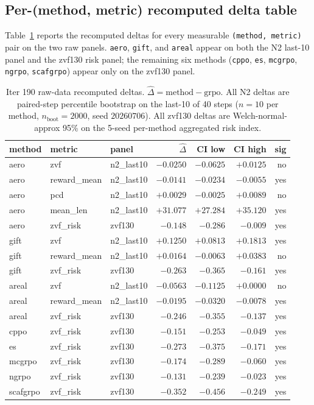 \subsection{Per-(method, metric) recomputed delta table}
Table~\ref{tab:p6-iter190-recomputed} reports the recomputed deltas for
every measurable \texttt{(method, metric)} pair on the two raw panels.
\verb|aero|, \verb|gift|, and \verb|areal| appear on both the
N2 last-10 panel and the zvf130 risk panel; the remaining six methods
(\verb|cppo|, \verb|es|, \verb|mcgrpo|, \verb|ngrpo|, \verb|scafgrpo|)
appear only on the zvf130 panel.

\begin{table}[h]
\centering
\small
\begin{tabular}{lllrrrr}
\toprule
method & metric & panel & $\hat\Delta$ & CI low & CI high & sig \\
\midrule
aero & zvf         & n2\_last10    & $-0.0250$ & $-0.0625$ & $+0.0125$ & no  \\
aero & reward\_mean& n2\_last10    & $-0.0141$ & $-0.0234$ & $-0.0055$ & yes \\
aero & pcd         & n2\_last10    & $+0.0029$ & $-0.0025$ & $+0.0089$ & no  \\
aero & mean\_len   & n2\_last10    & $+31.077$ & $+27.284$ & $+35.120$ & yes \\
aero & zvf\_risk   & zvf130        & $-0.148$  & $-0.286$  & $-0.009$  & yes \\
\midrule
gift & zvf         & n2\_last10    & $+0.1250$ & $+0.0813$ & $+0.1813$ & yes \\
gift & reward\_mean& n2\_last10    & $+0.0164$ & $-0.0063$ & $+0.0383$ & no  \\
gift & zvf\_risk   & zvf130        & $-0.263$  & $-0.365$  & $-0.161$  & yes \\
\midrule
areal& zvf         & n2\_last10    & $-0.0563$ & $-0.1125$ & $+0.0000$ & no  \\
areal& reward\_mean& n2\_last10    & $-0.0195$ & $-0.0320$ & $-0.0078$ & yes \\
areal& zvf\_risk   & zvf130        & $-0.246$  & $-0.355$  & $-0.137$  & yes \\
\midrule
cppo & zvf\_risk   & zvf130        & $-0.151$  & $-0.253$  & $-0.049$  & yes \\
es   & zvf\_risk   & zvf130        & $-0.273$  & $-0.375$  & $-0.171$  & yes \\
mcgrpo& zvf\_risk  & zvf130        & $-0.174$  & $-0.289$  & $-0.060$  & yes \\
ngrpo& zvf\_risk   & zvf130        & $-0.131$  & $-0.239$  & $-0.023$  & yes \\
scafgrpo& zvf\_risk& zvf130        & $-0.352$  & $-0.456$  & $-0.249$  & yes \\
\bottomrule
\end{tabular}
\caption{Iter 190 raw-data recomputed deltas. $\hat\Delta = \text{method} - \text{grpo}$.
All N2 deltas are paired-step percentile bootstrap on the last-10 of 40
steps ($n{=}10$ per method, $n_{\text{boot}}{=}2000$, seed $20260706$).
All zvf130 deltas are Welch-normal-approx 95\% on the 5-seed
per-method aggregated risk index.}
\label{tab:p6-iter190-recomputed}
\end{table}

